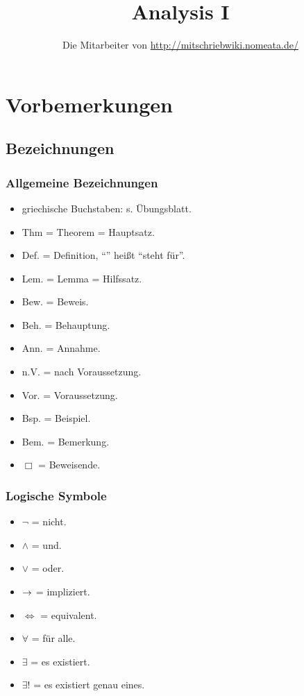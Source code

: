\documentclass[12pt]{scrreprt}
\author{Die Mitarbeiter von \url{http://mitschriebwiki.nomeata.de/}}
\title{Analysis I}
\begin{document}
\maketitle

\tableofcontents

\setcounter{chapter}{-1}
\chapter{Vorbemerkungen}
\label{cha:vor}

\section{Bezeichnungen}
\label{sec:vor.bezeichnungen}
\subsection{Allgemeine Bezeichnungen}
\begin{itemize}
\item griechische Buchstaben: s. Übungsblatt.
\item Thm = Theorem = Hauptsatz.
\item Def. = Definition, "`{\da}"' heißt "`steht für"'.
\item Lem. = Lemma = Hilfssatz.
\item Bew. = Beweis.
\item Beh. = Behauptung.
\item Ann. = Annahme.
\item n.V. = nach Voraussetzung.
\item Vor. = Voraussetzung.
\item Bsp. = Beispiel.
\item Bem. = Bemerkung.
\item $\Box$ = Beweisende.
\end{itemize}

\subsection{Logische Symbole}
\begin{itemize}
\item $\neg$ = nicht.
\item $\wedge$ = und.
\item $\vee$ = oder.
\item $\rightarrow$ = impliziert.
\item $\Longleftrightarrow$ = equivalent.
\item $\forall$ = für alle.
\item $\exists$ = es existiert.
\item $\exists!$ = es existiert genau eines.
\end{itemize}
\end{document}
